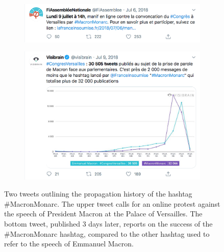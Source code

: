 \begin{figure}
    \begin{subfigure}{1\textwidth}
        \includegraphics[width=1\textwidth]{figures/Beatrice/FirstTweetMacronMonarc.png}
        \label{fig:first_tweet_macronmonarc}
    \end{subfigure}
    \begin{subfigure}{1\textwidth}
        \includegraphics[width=1\textwidth]{figures/Beatrice/LastTweetMacronMonarc.png}
        \label{fig:last_tweet_macronmonarc}
    \end{subfigure}
    \caption[Two tweets outlining the propagation history of the hashtag \#MacronMonarc]{Two tweets outlining the propagation history of the hashtag \#MacronMonarc. The upper tweet calls for an online protest against the speech of President Macron at the Palace of Versailles. The bottom tweet, published 3 days later, reports on the success of the \#MacronMonarc hashtag, compared to the other hashtag used to refer to the speech of Emmanuel Macron.}
    \label{fig:macronmonarc}
\end{figure}


